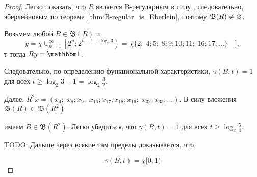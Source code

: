 \begin{proof}
	Легко показать, что $R$ является B-регулярным
	в силу ,
    следовательно, эберлейновым по теореме~\ref{thm:B-regular_is_Eberlein},
    поэтому $\mathfrak{B}(R)\ne \varnothing$.

    Возьмем любой $B \in \mathfrak{B}(R)$ и
    \begin{equation}
        y = \chi \cup_{n=1}^\infty \left[ 2^n; 2^{n-1+\log_2 3}\right) =
        \chi \{ 2; \; 4;5; \; 8;9;10;11; \; 16;17;... \}\quad]
        ,
    \end{equation}
    т тогда $Ry=\one$.

	Следовательно, по определению функциональной характеристики,
	$\gamma(B,t) = 1$ для всех $t \geq \log_2 3 - 1 = \log_2 \frac32$.

	Далее, $R^2 x = (x_4; \; x_8; x_9;\; x_{16}; x_{17}; x_{18}; x_{19}; \; x_{32}; x_{33};...)$.
	В силу вложения $\mathfrak{B}(R)\subset\mathfrak{B}(R^2)$


	имеем $B\in\mathfrak{B}(R^2)$.
	Легко убедиться, что $\gamma(B,t) = 1$ для всех $t \geq \log_2 \frac54$.

	TODO: Дальше через всякие там пределы доказывается, что

	\begin{equation}
		\label{eq:gamma_chi_0_1}
		\gamma(B,t) = \chi{[}0;1)
	\end{equation}



\end{proof}
